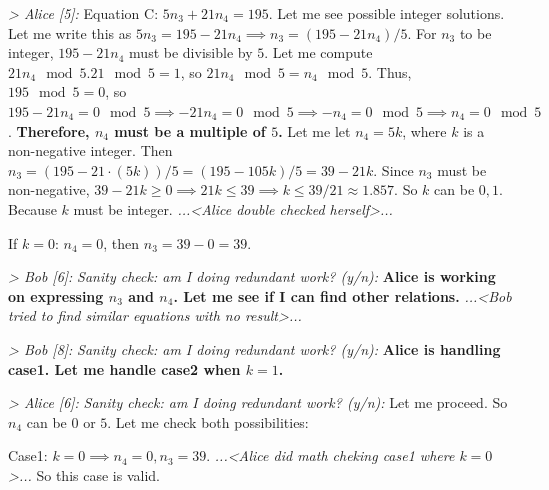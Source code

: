 
\textit{> Alice [5]:}  Equation C: $5n_3 +21n_4=195$. Let me see possible integer solutions. Let me write this as $5n_3 =195 -21n_4 \implies  n_3 = (195-21n_4)/5$. For $n_3$ to be integer, $195 -21n_4$ must be divisible by $5$. Let me compute $21n_4 \mod5. 21 \mod5=1$, so $21n_4 \mod5 =n_4 \mod5$. Thus, $195 \mod5=0$, so $195 -21n_4 =0 \mod5 \implies  -21n_4 =0 \mod5 \implies  -n_4 =0 \mod5 \implies  n_4 =0 \mod5$. \textbf{Therefore, $n_4$ must be a multiple of $5$.} Let me let $n_4=5k$, where $k$ is a non-negative integer. Then $n_3=(195 -21\cdot (5k))/5 = (195 -105k)/5 =39 -21k$. Since $n_3$ must be non-negative, $39-21k \geq0 \implies  21k \leq39 \implies  k \leq39/21 \approx 1.857$. So $k$ can be $0,1$. Because $k$ must be integer. \textit{...<Alice double checked herself>...}

If $k=0$: $n_4=0$, then $n_3=39-0=39$.

\textit{> Bob [6]:} \textit{Sanity check: am I doing redundant work? (y/n):} \textbf{Alice is working on expressing $n_3$ and $n_4$. Let me see if I can find other relations.} \textit{...<Bob tried to find similar equations with no result>...}



\textit{> Bob [8]:} \textit{Sanity check: am I doing redundant work? (y/n):} \textbf{Alice is handling case1. Let me handle case2 when $k=1$.}

\textit{> Alice [6]:} \textit{Sanity check: am I doing redundant work? (y/n):} Let me proceed. So $n_4$ can be $0$ or $5$. Let me check both possibilities:

Case1: $k=0 \implies n_4=0, n_3=39$. 
\textit{...<Alice did math cheking case1 where $k=0$>...}
So this case is valid.

